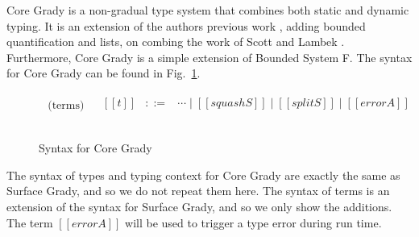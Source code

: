 Core Grady is a non-gradual type system that combines both static and
dynamic typing.  It is an extension of the authors previous work
\cite{Eades:2017}, adding bounded quantification and lists, on combing
the work of Scott \cite{Scott:1980} and Lambek \cite{Lambek:1988}.
Furthermore, Core Grady is a simple extension of Bounded System F.
The syntax for Core Grady can be found in
Fig.~\ref{fig:syntax-core-grady}.
\begin{figure}
    \small
  \begin{mdframed}
      \[
      \begin{array}{cl}
                
        \begin{array}{l}
          \text{(terms)}
        \end{array}     &
        \begin{array}{lcl}
          [[t]] & ::= & \cdots \mid [[squash S]] \mid [[split S]] \mid [[error A]]\\
        \end{array}\\\\        
      \end{array}
      \]    
  \end{mdframed}
  \caption{Syntax for Core Grady}
  \label{fig:syntax-core-grady}
\end{figure}
The syntax of types and typing context for Core Grady are exactly the
same as Surface Grady, and so we do not repeat them here.  The syntax
of terms is an extension of the syntax for Surface Grady, and so we
only show the additions.  The term $[[error A]]$ will be used to
trigger a type error during run time.

